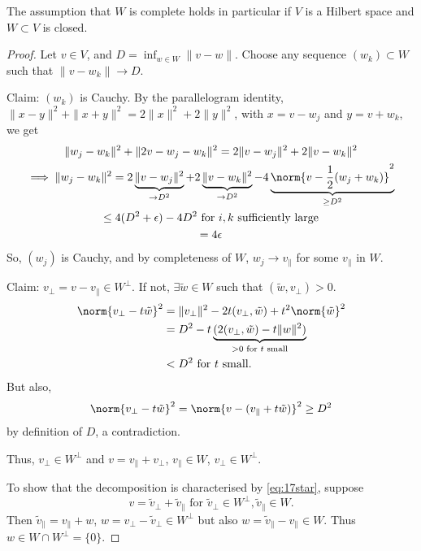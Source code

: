 \documentclass{article}
\begin{document}
The assumption that $W$ is complete holds in particular if $V$ is a Hilbert space and $W \subset V$ is closed.

\begin{proof}
    Let $v \in V$, and $D = \inf_{w \in W} \|v - w\|$. Choose any sequence $(w_k) \subset W$ such that $\|v - w_k\| \to D$.

    Claim: $(w_k)$ is Cauchy.
    By the parallelogram identity, $\|x - y\|^2 + \|x+y\|^2 = 2 \|x\|^2 + 2 \|y\|^2$, with $x = v-w_j$ and $y = v+w_k$, we get
    \begin{gather}
        \|w_j - w_k\|^2 + \|2v - w_j - w_k\|^2 = 2 \|v - w_j\|^2 + 2 \|v - w_k\|^2 \\
        \implies \|w_j - w_k\|^2 = 2 \underbrace{\|v - w_j\|^2}_{\to D^2} + 2 \underbrace{\|v - w_k\|^2}_{\to D^2} - 4 \underbrace{\norm{v - \frac{1}{2}(w_j + w_k)}^2}_{\geq D^2} \\
        \leq 4(D^2 + \epsilon) - 4D^2 \text{ for $i, k$ sufficiently large} \\
        = 4\epsilon
    \end{gather}
    So, $(w_j)$ is Cauchy, and by completeness of $W$, $w_j \to v_\parallel$ for some $v_\parallel$ in $W$.


    Claim: $v_\perp = v - v_\parallel \in W^\perp$. If not, $\exists \tilde{w} \in W$ such that $(\tilde{w}, v_\perp) > 0$.
    \begin{align*}
        \norm{v_\perp - t \tilde{w}}^2 &= \|v_\perp\|^2 - 2 t (v_\perp, \tilde{w}) + t^2 \norm{\tilde{w}}^2 \\
                                       &= D^2 - t\underbrace{(2 (v_\perp, \tilde{w}) - t \|w\|^2)}_{>0 \text{ for $t$ small}} \\
                                       &< D^2 \text{ for $t$ small.}
    \end{align*}
    But also,
    \begin{equation*}
        \norm{v_\perp - t \tilde{w}}^2 = \norm{v - (v_\parallel + t \tilde{w})}^2 \geq D^2
    \end{equation*}
    by definition of $D$, a contradiction.

    Thus, $v_\perp \in W^\perp$ and $v = v_\parallel + v_\perp$, $v_\parallel \in W$, $v_\perp \in W^\perp$.

    To show that the decomposition is characterised by \eqref{eq:17star}, suppose
    \begin{equation*}
        v = \tilde{v}_\perp + \tilde{v}_\parallel \text{ for } \tilde{v}_\perp \in W^\perp, \tilde{v}_\parallel \in W.
    \end{equation*}
    Then $\tilde{v}_\parallel = v_\parallel + w$, $w = v_\perp - \tilde{v}_\perp \in W^\perp$ but also $w = \tilde{v}_\parallel - v_\parallel \in W$. Thus $w \in W \cap W^\perp = \{0\}$.
\end{proof}
\end{document}

